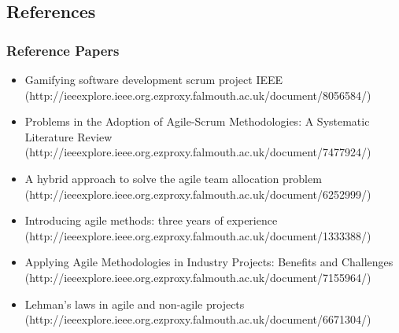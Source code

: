 \documentclass{beamer}
\begin{document}
\subsection{References}
\begin{frame}
\frametitle{Reference Papers}
\begin{itemize}
\item Gamifying software development scrum project IEEE
\\(http://ieeexplore.ieee.org.ezproxy.falmouth.ac.uk/document/8056584/)
\item Problems in the Adoption of Agile-Scrum Methodologies: A Systematic Literature Review\\ (http://ieeexplore.ieee.org.ezproxy.falmouth.ac.uk/document/7477924/)
\item A hybrid approach to solve the agile team allocation problem\\(http://ieeexplore.ieee.org.ezproxy.falmouth.ac.uk/document/6252999/)
\item Introducing agile methods: three years of experience\\(http://ieeexplore.ieee.org.ezproxy.falmouth.ac.uk/document/1333388/)
\item Applying Agile Methodologies in Industry Projects: Benefits and Challenges\\(http://ieeexplore.ieee.org.ezproxy.falmouth.ac.uk/document/7155964/)
\item Lehman's laws in agile and non-agile projects\\(http://ieeexplore.ieee.org.ezproxy.falmouth.ac.uk/document/6671304/)
\end{itemize}
\end{frame}
\end{document}
